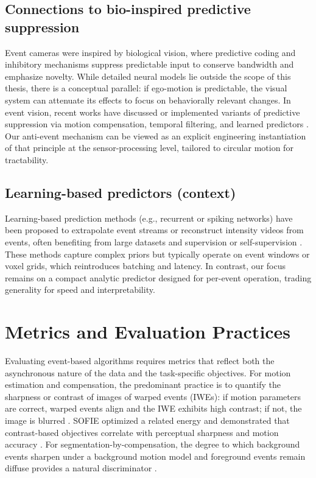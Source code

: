 \subsection{Connections to bio-inspired predictive suppression}
Event cameras were inspired by biological vision, where predictive coding and inhibitory mechanisms suppress predictable input to conserve bandwidth and emphasize novelty. While detailed neural models lie outside the scope of this thesis, there is a conceptual parallel: if ego-motion is predictable, the visual system can attenuate its effects to focus on behaviorally relevant changes. In event vision, recent works have discussed or implemented variants of predictive suppression via motion compensation, temporal filtering, and learned predictors \cite{Gallego2020Survey}. Our anti-event mechanism can be viewed as an explicit engineering instantiation of that principle at the sensor-processing level, tailored to circular motion for tractability.

\subsection{Learning-based predictors (context)}
Learning-based prediction methods (e.g., recurrent or spiking networks) have been proposed to extrapolate event streams or reconstruct intensity videos from events, often benefiting from large datasets and supervision or self-supervision \cite{Rebecq2019,Gallego2020Survey}. These methods capture complex priors but typically operate on event windows or voxel grids, which reintroduces batching and latency. In contrast, our focus remains on a compact analytic predictor designed for per-event operation, trading generality for speed and interpretability.

\section{Metrics and Evaluation Practices}
\label{sec:metrics-eval}

Evaluating event-based algorithms requires metrics that reflect both the asynchronous nature of the data and the task-specific objectives. For motion estimation and compensation, the predominant practice is to quantify the sharpness or contrast of images of warped events (IWEs): if motion parameters are correct, warped events align and the IWE exhibits high contrast; if not, the image is blurred \cite{Gallego2018CMax}. SOFIE optimized a related energy and demonstrated that contrast-based objectives correlate with perceptual sharpness and motion accuracy \cite{Bardow2016SOFIE}. For segmentation-by-compensation, the degree to which background events sharpen under a background motion model and foreground events remain diffuse provides a natural discriminator \cite{Stoffregen2019Segmentation}.

